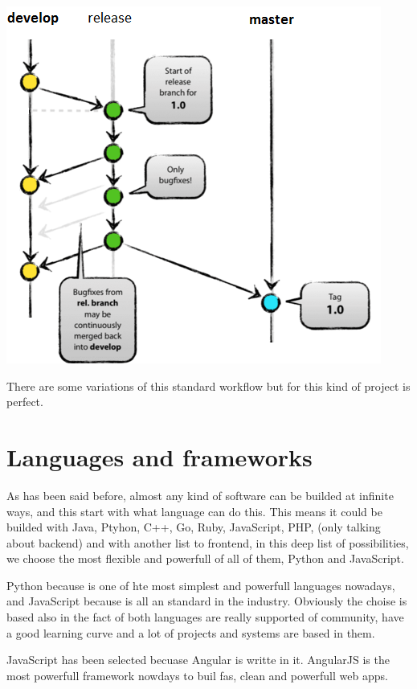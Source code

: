 \begin{center}
\includegraphics[scale=0.4]{img/git/release_branches.png}
\end{center}

There are some variations of this standard workflow but for this kind of project
is perfect.

\section{Languages and frameworks}

As has been said before, almost any kind of software can be builded at infinite
ways, and this start with what language can do this. This means it could be
builded with Java, Ptyhon, C++, Go, Ruby, JavaScript, PHP,  (only talking about
backend) and with another list to frontend, in this deep list of possibilities,
we choose the most flexible and powerfull of all of them, Python and JavaScript.

Python because is one of hte most simplest and powerfull languages nowadays, and
JavaScript because is all an standard in the industry. Obviously the choise is
based also in the fact of both languages are really supported of community, have a
good learning curve and a lot of projects and systems are based in them.

JavaScript has been selected becuase Angular is writte in it. AngularJS is the
most powerfull framework nowdays to buil fas, clean and powerfull web apps.


